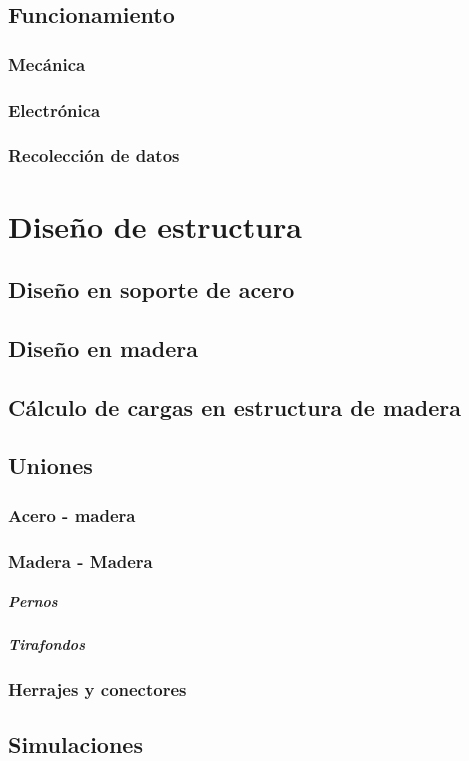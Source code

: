\subsection{Funcionamiento}
\subsubsection{Mecánica}
\subsubsection{Electrónica}
\subsubsection{Recolección de datos}


\section{Diseño de estructura}
\subsection{Diseño en soporte de acero}

\subsection{Diseño en madera}

\subsection{Cálculo de cargas en estructura de madera}

\subsection{Uniones}
\subsubsection{Acero - madera}
\subsubsection{Madera - Madera}
\subparagraph{Pernos}
\subparagraph{Tirafondos}
\subsubsection{Herrajes y conectores}

\subsection{Simulaciones}
